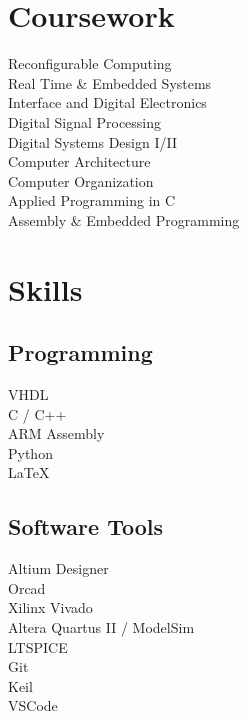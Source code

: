 \documentclass[]{deedy-resume-openfont}
\begin{document}
\begin{minipage}[t]{0.33\textwidth}


\section{Coursework}
Reconfigurable Computing \\
Real Time \& Embedded Systems \\
Interface and Digital Electronics \\
Digital Signal Processing \\
Digital Systems Design I/II \\
Computer Architecture \\
Computer Organization \\
Applied Programming in C \\
Assembly \& Embedded Programming \\
\sectionsep


\section{Skills}
\subsection{Programming}


VHDL \\ C / C++ \\ ARM Assembly \\ Python \\  
LaTeX \\


\sectionsep

\subsection{Software Tools}
Altium Designer \\
Orcad \\
Xilinx Vivado \\
Altera Quartus II / ModelSim\\ 
LTSPICE\\
Git\\
Keil\\
VSCode\\
\sectionsep


\end{minipage}
\end{document}
